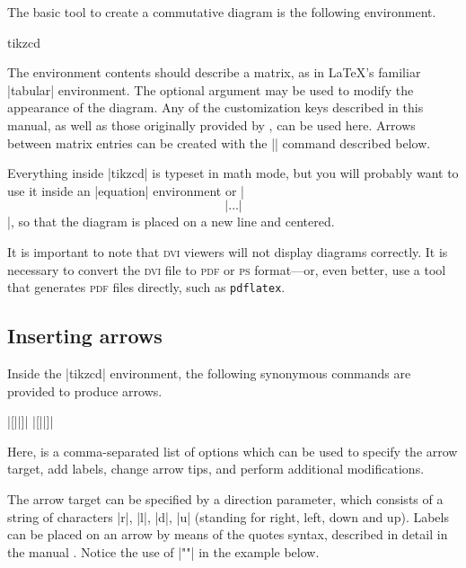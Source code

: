\documentclass[a4paper]{ltxdoc}
\begin{document}
The basic tool to create a commutative diagram is the following
environment.

\begin{environment}{{tikzcd}}
\end{environment}

The environment contents should describe a matrix, as in \LaTeX's
familiar |{tabular}| environment.  The optional argument
 may be used to modify the appearance of the diagram.
Any of the customization keys described in this manual, as well as
those originally provided by \tikzname{}, can be used here.  Arrows
between matrix entries can be created with the |\arrow| command
described below.

Everything inside |{tikzcd}| is typeset in math mode, but you will
probably want to use it inside an |{equation}| environment or
|\[| \dots |\]|,
so that the diagram is placed on a new line and centered.

It is important to note that \textsc{dvi} viewers will not display
diagrams correctly.  It is necessary to convert the \textsc{dvi} file
to \textsc{pdf} or \textsc{ps} format---or, even better, use a tool
that generates \textsc{pdf} files directly, such as \texttt{pdflatex}.

\subsection{Inserting arrows}
\label{sec:inserting-arrows}

Inside the |{tikzcd}| environment, the following synonymous commands
are provided to produce arrows.

\begin{pgfmanualentry}
  \extractcommand\arrow|[||]|\@@
  \extractcommand\ar|[||]|\@@
  \pgfmanualbody
\end{pgfmanualentry}

Here,  is a comma-separated list of options which can be
used to specify the arrow target, add labels, change arrow tips, and
perform additional modifications.

The arrow target can be specified by a direction parameter, which
consists of a string of characters |r|, |l|, |d|, |u| (standing for
right, left, down and up).  Labels can be placed on an arrow by means
of the quotes syntax, described in detail in the \pgfname{} manual
\cite[\S\ref*{pgfman-section-label-quotes}]{pgfman}.  Notice the use
of |"\phi"| in the example below.
\end{document}
